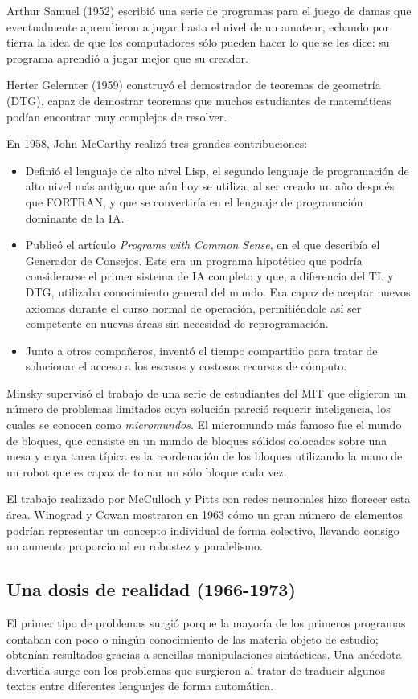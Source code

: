 \documentclass[12pt,a4paper]{article}
\begin{document}
Arthur Samuel (1952) escribió una serie de programas para el juego de damas que eventualmente aprendieron a jugar hasta el nivel de un amateur, echando por tierra la idea de que los computadores sólo pueden hacer lo que se les dice: su programa aprendió a jugar mejor que su creador.

Herter Gelernter (1959) construyó el demostrador de teoremas de geometría (DTG), capaz de demostrar teoremas que muchos estudiantes de matemáticas podían encontrar muy complejos de resolver.

En 1958, John McCarthy realizó tres grandes contribuciones:
\begin{itemize}
\item Definió el lenguaje de alto nivel Lisp, el segundo lenguaje de programación de alto nivel más antiguo que aún hoy se utiliza, al ser creado un año después que FORTRAN, y que se convertiría en el lenguaje de programación dominante de la IA.
\item Publicó el artículo \emph{Programs with Common Sense}, en el que describía el Generador de Consejos. Este era un programa hipotético que podría considerarse el primer sistema de IA completo y que, a diferencia del TL y DTG, utilizaba conocimiento general del mundo. Era capaz de aceptar nuevos axiomas durante el curso normal de operación, permitiéndole así ser competente en nuevas áreas sin necesidad de reprogramación.
\item Junto a otros compañeros, inventó el tiempo compartido para tratar de solucionar el acceso a los escasos y costosos recursos de cómputo.
\end{itemize}

Minsky supervisó el trabajo de una serie de estudiantes del MIT que eligieron un número de problemas limitados cuya solución pareció requerir inteligencia, los cuales se conocen como \emph{micromundos}. El micromundo más famoso fue el mundo de bloques, que consiste en un mundo de bloques sólidos colocados sobre una mesa y cuya tarea típica es la reordenación de los bloques utilizando la mano de un robot que es capaz de tomar un sólo bloque cada vez.

El trabajo realizado por McCulloch y Pitts con redes neuronales hizo florecer esta área. Winograd y Cowan mostraron en 1963 cómo un gran número de elementos podrían representar un concepto individual de forma colectivo, llevando consigo un aumento proporcional en robustez y paralelismo.

\subsection{Una dosis de realidad (1966-1973)}El primer tipo de problemas surgió porque la mayoría de los primeros programas contaban con poco o ningún conocimiento de las materia objeto de estudio; obtenían resultados gracias a sencillas manipulaciones sintácticas. Una anécdota divertida surge con los problemas que surgieron al tratar de traducir algunos textos entre diferentes lenguajes de forma automática.
\end{document}
